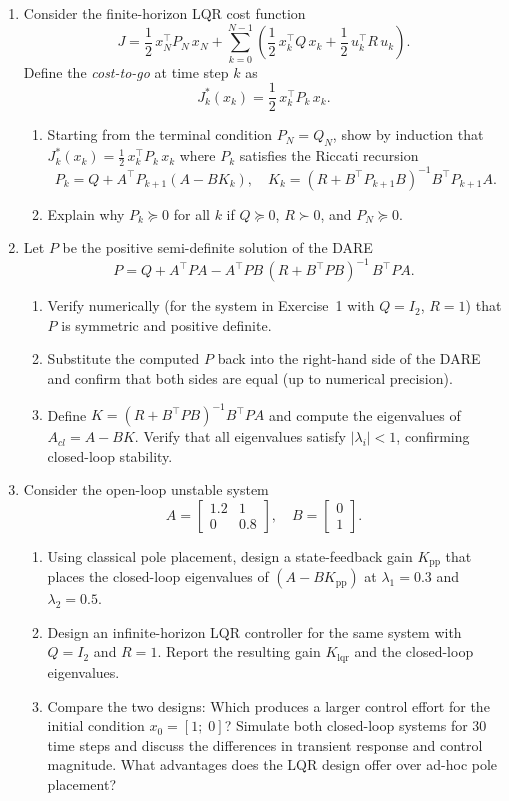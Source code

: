 \begin{enumerate}
	\item Consider the finite-horizon LQR cost function
	\[
	J = \frac{1}{2}\,x_N^\top P_N\,x_N + \sum_{k=0}^{N-1}\left(\frac{1}{2}\,x_k^\top Q\,x_k + \frac{1}{2}\,u_k^\top R\,u_k\right).
	\]
	Define the \emph{cost-to-go} at time step $k$ as
	\[
	J_k^*(x_k) = \frac{1}{2}\,x_k^\top P_k\,x_k.
	\]
	\begin{enumerate}
		\item Starting from the terminal condition $P_N = Q_N$, show by induction that $J_k^*(x_k) = \frac{1}{2}\,x_k^\top P_k\,x_k$ where $P_k$ satisfies the Riccati recursion
		\[
		P_k = Q + A^\top P_{k+1}(A - BK_k), \quad K_k = (R + B^\top P_{k+1} B)^{-1} B^\top P_{k+1} A.
		\]
		\item Explain why $P_k \succeq 0$ for all $k$ if $Q \succeq 0$, $R \succ 0$, and $P_N \succeq 0$.
	\end{enumerate}

	\item Let $P$ be the positive semi-definite solution of the DARE
	\[
	P = Q + A^\top P A - A^\top P B\,(R + B^\top P B)^{-1}\,B^\top P A.
	\]
	\begin{enumerate}
		\item Verify numerically (for the system in Exercise~1 with $Q = I_2$, $R = 1$) that $P$ is symmetric and positive definite.
		\item Substitute the computed $P$ back into the right-hand side of the DARE and confirm that both sides are equal (up to numerical precision).
		\item Define $K = (R + B^\top P B)^{-1} B^\top P A$ and compute the eigenvalues of $A_{cl} = A - BK$. Verify that all eigenvalues satisfy $|\lambda_i| < 1$, confirming closed-loop stability.
	\end{enumerate}

	\item Consider the open-loop unstable system
	\[
	A = \begin{bmatrix} 1.2 & 1 \\ 0 & 0.8 \end{bmatrix}, \quad B = \begin{bmatrix} 0 \\ 1 \end{bmatrix}.
	\]
	\begin{enumerate}
		\item Using classical pole placement, design a state-feedback gain $K_{\mathrm{pp}}$ that places the closed-loop eigenvalues of $(A - BK_{\mathrm{pp}})$ at $\lambda_1 = 0.3$ and $\lambda_2 = 0.5$.
		\item Design an infinite-horizon LQR controller for the same system with $Q = I_2$ and $R = 1$. Report the resulting gain $K_{\mathrm{lqr}}$ and the closed-loop eigenvalues.
		\item Compare the two designs: Which produces a larger control effort for the initial condition $x_0 = [1;\;0]$? Simulate both closed-loop systems for 30 time steps and discuss the differences in transient response and control magnitude. What advantages does the LQR design offer over ad-hoc pole placement?
	\end{enumerate}


\end{enumerate}
